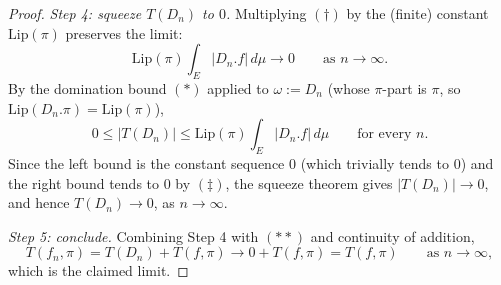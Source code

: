 \begin{proof}
  \emph{Step 4: squeeze $T(D_n)$ to $0$.} Multiplying $(\dagger)$ by the (finite) constant
  $\mathrm{Lip}(\pi)$ preserves the limit:
  \[
    \mathrm{Lip}(\pi) \int_E |D_n.f| \, d\mu \longrightarrow 0
    \qquad \text{as } n \to \infty
    . \tag{$\ddagger$}
  \]
  By the domination bound $(\ast)$ applied to $\omega := D_n$ (whose $\pi$-part is $\pi$, so
  $\mathrm{Lip}(D_n.\pi) = \mathrm{Lip}(\pi)$),
  \[
    0 \le |T(D_n)| \le \mathrm{Lip}(\pi) \int_E |D_n.f| \, d\mu
    \qquad \text{for every } n
    .
  \]
  Since the left bound is the constant sequence $0$ (which trivially tends to $0$) and the right
  bound tends to $0$ by $(\ddagger)$, the squeeze theorem gives $|T(D_n)| \to 0$, and hence
  $T(D_n) \to 0$, as $n \to \infty$.

  \emph{Step 5: conclude.} Combining Step 4 with $(\ast\ast)$ and continuity of addition,
  \[
    T(f_n,\pi) = T(D_n) + T(f,\pi) \longrightarrow 0 + T(f,\pi) = T(f,\pi)
    \qquad \text{as } n \to \infty
    ,
  \]
  which is the claimed limit.
\end{proof}
